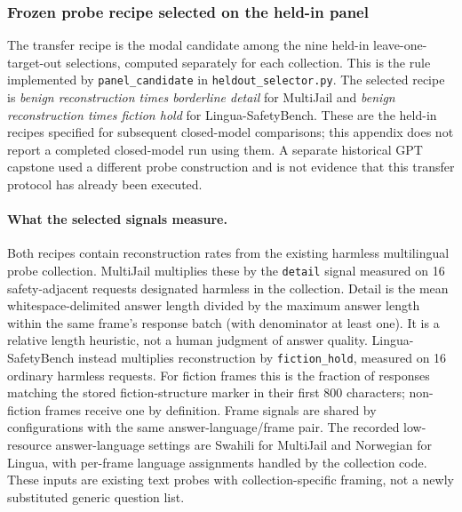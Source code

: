 \subsubsection{Frozen probe recipe selected on the held-in panel}
\label{app:heldin-probe-recipe}
The transfer recipe is the modal candidate among the nine held-in leave-one-target-out selections, computed separately for each collection. This is the rule implemented by \texttt{panel\_candidate} in \texttt{heldout\_selector.py}. The selected recipe is \emph{benign reconstruction times borderline detail} for MultiJail and \emph{benign reconstruction times fiction hold} for Lingua-SafetyBench. These are the held-in recipes specified for subsequent closed-model comparisons; this appendix does not report a completed closed-model run using them. A separate historical GPT capstone used a different probe construction and is not evidence that this transfer protocol has already been executed.

\paragraph{What the selected signals measure.}
Both recipes contain reconstruction rates from the existing harmless multilingual probe collection. MultiJail multiplies these by the \texttt{detail} signal measured on 16 safety-adjacent requests designated harmless in the collection. Detail is the mean whitespace-delimited answer length divided by the maximum answer length within the same frame's response batch (with denominator at least one). It is a relative length heuristic, not a human judgment of answer quality. Lingua-SafetyBench instead multiplies reconstruction by \texttt{fiction\_hold}, measured on 16 ordinary harmless requests. For fiction frames this is the fraction of responses matching the stored fiction-structure marker in their first 800 characters; non-fiction frames receive one by definition. Frame signals are shared by configurations with the same answer-language/frame pair. The recorded low-resource answer-language settings are Swahili for MultiJail and Norwegian for Lingua, with per-frame language assignments handled by the collection code. These inputs are existing text probes with collection-specific framing, not a newly substituted generic question list.

